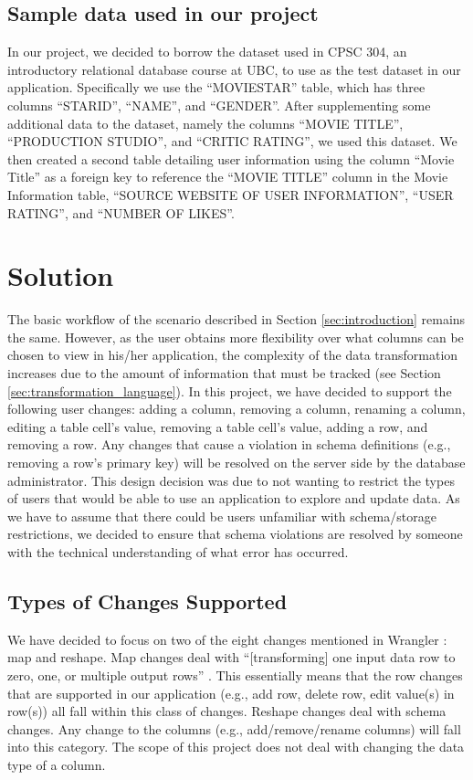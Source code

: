 \documentclass[12pt]{article}
\begin{document}
\subsection{Sample data used in our project}
In our project, we decided to borrow the dataset used in CPSC 304, an introductory relational database course at UBC, to use as the test dataset in our application.  Specifically we use the ``MOVIESTAR'' table, which has three columns ``STARID'', ``NAME'', and ``GENDER''. After supplementing some additional data to the dataset, namely the columns ``MOVIE TITLE'', ``PRODUCTION STUDIO'', and ``CRITIC RATING'', we used this dataset. We then created a second table detailing user information using the column ``Movie Title'' as a foreign key to reference the ``MOVIE TITLE'' column in the Movie Information table, ``SOURCE WEBSITE OF USER INFORMATION'', ``USER RATING'', and ``NUMBER OF LIKES''.

\section{Solution}
The basic workflow of the scenario described in Section \ref{sec:introduction} remains the same. However, as the user obtains more flexibility over what columns can be chosen to view in his/her application,  the complexity of the data transformation increases due to the amount of information that must be tracked (see Section \ref{sec:transformation_language}). In this project, we have decided to support the following user changes: adding a column, removing a column, renaming a column, editing a table cell's value, removing a table cell's value, adding a row, and removing a row. Any changes that cause a violation in schema definitions (e.g., removing a row's primary key) will be resolved on the server side by the database administrator. This design decision was due to not wanting to restrict the types of users that would be able to use an application to explore and update data. As we have to assume that there could be users unfamiliar with schema/storage restrictions, we decided to ensure that schema violations are resolved by someone with the technical understanding of what error has occurred. 

\subsection{Types of Changes Supported}
\label{sec:types_of_changes}
We have decided to focus on two of the eight changes mentioned in Wrangler \cite{kandel2011wrangler}: map and reshape. Map changes deal with ``[transforming] one input data row to zero, one, or multiple output rows'' \cite{kandel2011wrangler}. This essentially means that the row changes that are supported in our application (e.g., add row, delete row, edit value(s) in row(s)) all fall within this class of changes. Reshape changes deal with schema changes. Any change to the columns (e.g., add/remove/rename columns) will fall into this category. The scope of this project does not deal with changing the data type of a column.
\end{document}

